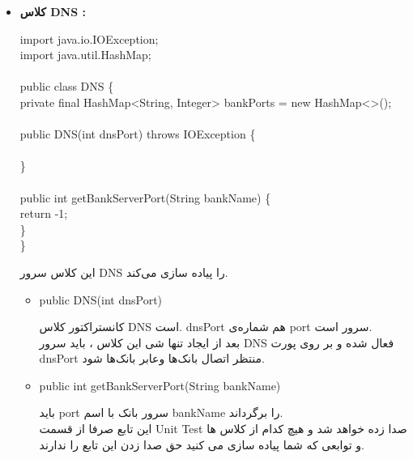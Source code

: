 \documentclass[]{article}
\newcommand\tab[1][1cm]{\hspace*{#1}}
\begin{document}
\begin{itemize}
\item \textbf{کلاس DNS :}\\
\begin{tcolorbox}[boxrule=0pt]
	\begin{latin}
  	  \large{
import java.io.IOException;\\
import java.util.HashMap;\\
\\
public class DNS \{\\
\tab    private final HashMap<String, Integer> bankPorts = new HashMap<>();\\
\\
\tab    public DNS(int dnsPort) throws IOException \{\\
\\
\tab    \}\\
\\
\tab    public int getBankServerPort(String bankName) \{\\
\tab  \tab        return -1;\\
\tab    \}\\
\}\\
		}
	\end{latin}
\end{tcolorbox}
این کلاس سرور DNS را پیاده‌ سازی می‌کند.
\begin{itemize}[label = {}]
\item	
\begin{tcolorbox}[boxrule=0pt]
	\begin{latin}
  	  \large{
  	  	public DNS(int dnsPort)
		}
	\end{latin}
\end{tcolorbox}

کانستراکتور کلاس DNS است. dnsPort هم شماره‌ی port ‌سرور است.
\\
بعد از ایجاد تنها شی این کلاس ، باید سرور DNS فعال شده و بر روی پورت dnsPort منتظر اتصال بانک‌ها وعابر بانک‌ها شود.
\item	
\begin{tcolorbox}[boxrule=0pt]
	\begin{latin}
  	  \large{
  	  	public int getBankServerPort(String bankName)
		}
	\end{latin}
\end{tcolorbox}

باید port سرور بانک با اسم bankName را برگرداند.
\\
این تابع صرفا از قسمت Unit Test صدا زده خواهد شد و هیچ کدام از کلاس ها و توابعی که شما پیاده سازی می کنید حق صدا زدن این تابع را ندارند.\end{itemize}


\end{itemize}
\end{document}
